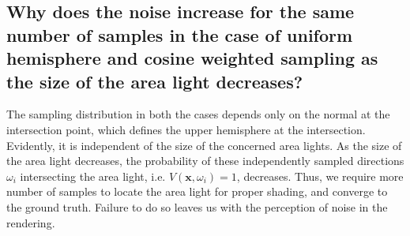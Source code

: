 \documentclass[a4paper]{myarticle}
\begin{document}
\subsection{Why does the noise increase for the same number of samples in the case of uniform hemisphere and cosine weighted sampling as the size of the area light decreases?}

The sampling distribution in both the cases depends only on the normal at the intersection point, which defines the upper hemisphere at the intersection. Evidently, it is independent of the size of the concerned area lights. As the size of the area light decreases, the probability of these independently sampled directions $\omega_i$ intersecting the area light, i.e. $V(\textbf{x}, \omega_i) = 1$, decreases. Thus, we require more number of samples to locate the area light for proper shading, and converge to the ground truth. Failure to do so leaves us with the perception of noise in the rendering.
\end{document}
